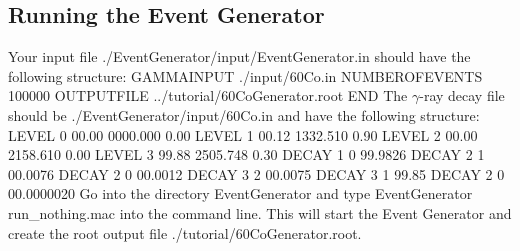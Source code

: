 \documentclass[12pt]{book}
\begin{document}
\subsection{Running the Event Generator}
Your input file {\ttfamily ./EventGenerator/input/EventGenerator.in} should have the following structure:\hfill{}
\linebreak
\linebreak
{\ttfamily %
  GAMMAINPUT ./input/60Co.in\linebreak
  NUMBEROFEVENTS 100000\linebreak
  OUTPUTFILE ../tutorial/60CoGenerator.root\linebreak
  END
}
\linebreak
\linebreak
The $\gamma$-ray decay file should be {\ttfamily ./EventGenerator/input/60Co.in} and have the following structure:\hfil{}
\linebreak
\linebreak
{\ttfamily
  LEVEL  0  00.00 0000.000 0.00\linebreak
  LEVEL  1  00.12 1332.510 0.90\linebreak
  LEVEL  2  00.00 2158.610 0.00\linebreak
  LEVEL  3  99.88 2505.748 0.30\linebreak
  DECAY  1  0 99.9826\linebreak
  DECAY  2  1 00.0076\linebreak
  DECAY  2  0 00.0012\linebreak
  DECAY  3  2 00.0075\linebreak
  DECAY  3  1 99.85\linebreak
  DECAY  2  0 00.0000020\linebreak
}
\linebreak
Go into the directory {\ttfamily EventGenerator} and type\hfill{}
\linebreak
\linebreak
{\ttfamily
  EventGenerator run\_nothing.mac
}
\linebreak
\linebreak
into the command line.
This will start the Event Generator and create the root output file {\ttfamily ./tutorial/60CoGenerator.root}.
\end{document}
